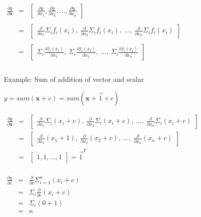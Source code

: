 \documentclass[11pt]{article}
\begin{document}
$
\begin{array}{lcl}
\frac{\partial y}{\partial \mathbf{x}} & = & \begin{bmatrix} \frac{\partial y}{\partial x_1}, \frac{\partial y}{\partial x_2}, \ldots, \frac{\partial y}{\partial x_n} \end{bmatrix}\\\\
 & = & \begin{bmatrix} \frac{\partial}{\partial x_1} \Sigma_i f_i(x_i),~ \frac{\partial}{\partial x_2} \Sigma_i f_i(x_i),~ \ldots,~ \frac{\partial}{\partial x_n} \Sigma_i  f_i(x_i) \end{bmatrix}\\\\
 & = & \begin{bmatrix} \Sigma_i \frac{\partial f_i(x_i)}{\partial x_1},~ \Sigma_i \frac{\partial f_i(x_i)}{\partial x_2},~ \ldots,~ \Sigma_i \frac{\partial f_i(x_i)}{\partial x_n}  \end{bmatrix}\\\\
\end{array}
$

Example: Sum of addition of vector and scalar


$y = sum(\mathbf{x} + c) = sum(\mathbf{x} + \vec{1} \times c)$

$
\begin{array}{lcl}
\frac{\partial y}{\partial \mathbf{x}} & = & \begin{bmatrix} \frac{\partial}{\partial x_1} \Sigma_i (x_i+c),~ \frac{\partial}{\partial x_2} \Sigma_i (x_i+c),~ \ldots,~ \frac{\partial}{\partial x_n} \Sigma_i  (x_i+c) \end{bmatrix}\\
 & = & \begin{bmatrix} \frac{\partial}{\partial x_1} (x_1+1),~ \frac{\partial}{\partial x_2} (x_2+c),~ \ldots,~ \frac{\partial}{\partial x_n}  (x_n+c) \end{bmatrix}\\
 & = & \begin{bmatrix} 1, 1, \dots, 1 \end{bmatrix} = \vec{1}^T\\
\end{array}
$

$
\begin{array}{lcl}
\frac{\partial y}{\partial c} & = & \frac{\partial}{\partial c} \Sigma_{i=1}^n (x_i+c)\\
& = & \Sigma_i \frac{\partial}{\partial c} (x_i+c)\\
& = & \Sigma_i (0 + 1)\\
& = & n
\end{array}
$

 
 
\end{document}
